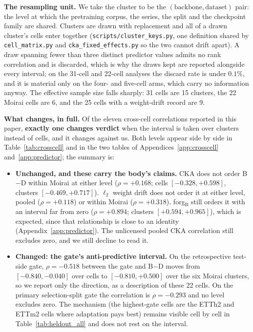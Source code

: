 \textbf{The resampling unit.} We take the cluster to be the
$(\text{backbone}, \text{dataset})$ pair: the level at which the pretraining
corpus, the series, the split and the checkpoint family are shared. Clusters are
drawn with replacement and all of a drawn cluster's cells enter together
(\texttt{scripts/cluster\_keys.py}, one definition shared by
\texttt{cell\_matrix.py} and \texttt{cka\_fixed\_effects.py} so the two cannot
drift apart). A draw spanning fewer than three distinct predictor values admits no
rank correlation and is discarded, which is why the draws kept are reported
alongside every interval; on the 31-cell and 22-cell analyses the discard rate is
under $0.1\%$, and it is material only on the four- and five-cell arms, which
carry no information anyway. The effective sample size falls sharply: 31 cells are
15 clusters, the 22 Moirai cells are 6, and the 25 cells with a weight-drift
record are 9.

\textbf{What changes, in full.} Of the eleven cross-cell correlations reported in
this paper, \textbf{exactly one changes verdict} when the interval is taken over
clusters instead of cells, and it changes against us. Both levels appear side by
side in Table~\ref{tab:crosscell} and in the two tables of
Appendices~\ref{app:crosscell} and~\ref{app:predictor}; the summary is:

\begin{itemize}
\item \textbf{Unchanged, and these carry the body's claims.} CKA does not order
  B$-$D within Moirai at either level ($\rho{=}{+}0.168$; cells
  $[-0.328, +0.598]$, clusters $[-0.469, +0.717]$). $\ell_2$ weight drift does not
  order it at either level, pooled ($\rho{=}{+}0.118$) or within Moirai
  ($\rho{=}{+}0.318$). forg$_\text{B}$ still orders it with an interval far from
  zero ($\rho{=}{+}0.894$; clusters $[+0.594, +0.965]$), which is expected,
  since that relationship is close to an identity
  (Appendix~\ref{app:predictor}). The unlicensed pooled CKA correlation still
  excludes zero, and we still decline to read it.
\item \textbf{Changed: the gate's anti-predictive interval.} On the retrospective
  test-side gate, $\rho{=}{-}0.518$ between the gate and B$-$D moves from
  $[-0.840, -0.040]$ over cells to $[-0.810, +0.500]$ over the six Moirai
  clusters, so we report only the direction, as a description of these 22
  cells. On the primary selection-split gate the correlation is
  $\rho{=}{-}0.293$ and no level excludes zero. The mechanism (the highest-gate
  cells are the ETTh2 and ETTm2 cells where adaptation pays best) remains visible
  cell by cell in Table~\ref{tab:heldout_all} and does not rest on the interval.
\end{itemize}

